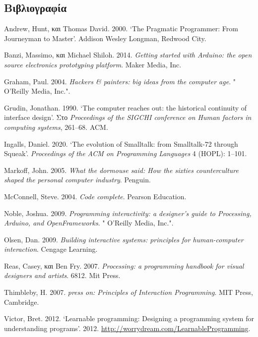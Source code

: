 \documentclass[
]{article}
\newlength{\cslhangindent}
\newlength{\cslentryspacingunit} %
\newenvironment{CSLReferences}[2] %
 {%
  \setlength{\parindent}{0pt}
  \ifodd #1
  \let\oldpar\par
  \def\par{\hangindent=\cslhangindent\oldpar}
  \fi
  \setlength{\parskip}{#2\cslentryspacingunit}
 }%
 {}
\begin{document}
\hypertarget{ux3b2ux3b9ux3b2ux3bbux3b9ux3bfux3b3ux3c1ux3b1ux3c6ux3afux3b1}{%
\subsection*{Βιβλιογραφία}\label{ux3b2ux3b9ux3b2ux3bbux3b9ux3bfux3b3ux3c1ux3b1ux3c6ux3afux3b1}}

\hypertarget{refs}{}
\begin{CSLReferences}{0}{0}
\end{CSLReferences}

Andrew, Hunt, και Thomas David. 2000. {`The Pragmatic Programmer: From
Journeyman to Master'}. Addison Wesley Longman, Redwood City.

Banzi, Massimo, και Michael Shiloh. 2014. \emph{Getting started with
Arduino: the open source electronics prototyping platform}. Maker Media,
Inc.

Graham, Paul. 2004. \emph{Hackers \& painters: big ideas from the
computer age}. " O'Reilly Media, Inc.".

Grudin, Jonathan. 1990. {`The computer reaches out: the historical
continuity of interface design'}. Στο \emph{Proceedings of the SIGCHI
conference on Human factors in computing systems}, 261--68. ACM.

Ingalls, Daniel. 2020. {`The evolution of Smalltalk: from Smalltalk-72
through Squeak'}. \emph{Proceedings of the ACM on Programming Languages}
4 (HOPL): 1--101.

Markoff, John. 2005. \emph{What the dormouse said: How the sixties
counterculture shaped the personal computer industry}. Penguin.

McConnell, Steve. 2004. \emph{Code complete}. Pearson Education.

Noble, Joshua. 2009. \emph{Programming interactivity: a designer's guide
to Processing, Arduino, and OpenFrameworks}. " O'Reilly Media, Inc.".

Olsen, Dan. 2009. \emph{Building interactive systems: principles for
human-computer interaction}. Cengage Learning.

Reas, Casey, και Ben Fry. 2007. \emph{Processing: a programming handbook
for visual designers and artists}. 6812. Mit Press.

Thimbleby, H. 2007. \emph{press on: Principles of Interaction
Programming}. MIT Press, Cambridge.

Victor, Bret. 2012. {`Learnable programming: Designing a programming
system for understanding programs'}. 2012.
\url{http://worrydream.com/LearnableProgramming}.
\end{document}
